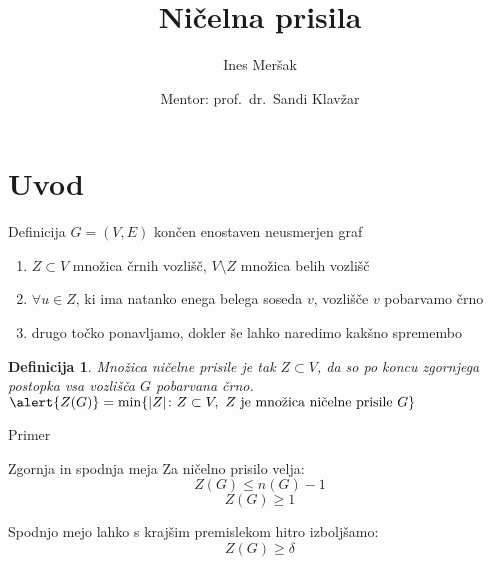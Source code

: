 \documentclass{beamer}
\title[Ničelna prisila]{Ničelna prisila}
\author{Ines Meršak}
\date[25.9.2019]{Mentor: prof.~dr.~Sandi Klavžar}
\newtheorem{definicija}{Definicija}
\begin{document}
\frame{\titlepage}

\section{Uvod}
\begin{frame}[fragile]{Definicija}
    $ G = (V,E)$ končen enostaven neusmerjen graf

    \medskip
    
    \begin{enumerate}
        \item $Z \subset V$ množica črnih vozlišč, $V \setminus Z$ množica belih vozlišč
        \item $\forall u \in Z$, ki ima natanko enega belega soseda $v$, vozlišče $v$ pobarvamo črno
        \item drugo točko ponavljamo, dokler še lahko naredimo kakšno spremembo
    \end{enumerate}
    \begin{definicija}
        \alert{Množica ničelne prisile} je tak $Z \subset V$, da so po koncu zgornjega postopka vsa vozlišča $G$ pobarvana črno.
        $\alert{Z(G)} = \min \{|Z|\colon Z \subset V ,\ Z\text{ je množica ničelne prisile }G \} $
    \end{definicija}
\end{frame}

\begin{frame}{Primer}
    \begin{figure}
        \centering
    \end{figure}
\end{frame}

\begin{frame}{Zgornja in spodnja meja}
    Za ničelno prisilo velja: 
    \[ Z(G) \leq n(G) - 1 \]
    \[ Z(G)  \geq 1 \]
    
    Spodnjo mejo lahko s krajšim premislekom hitro izboljšamo:
    \[ Z(G) \geq \delta \]
\end{frame}
\end{document}
